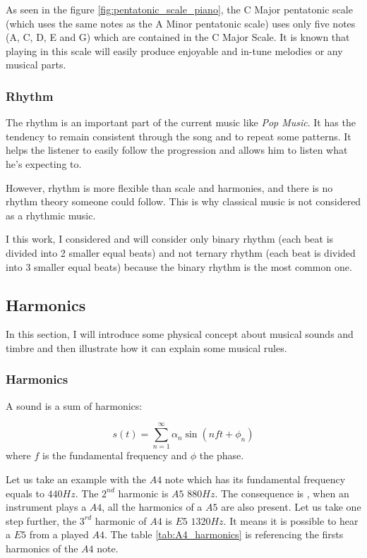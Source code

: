 \documentclass[12pt]{report}
\begin{document}
As seen in the figure \ref{fig:pentatonic_scale_piano}, the C Major pentatonic scale (which uses the same notes as the A Minor pentatonic scale) uses only five notes (A, C, D, E and G) which are contained in the C Major Scale. It is known that playing in this scale will easily produce enjoyable and in-tune melodies or any musical parts. 


\subsubsection{Rhythm}

The rhythm is an important part of the current music like \textit{Pop Music}. It has the tendency to remain consistent through the song and to repeat some patterns.
It helps the listener to easily follow the progression and allows him to listen what he's expecting to.

However, rhythm is more flexible than scale and harmonies, and there is no rhythm theory someone could follow.
This is why classical music is not considered as a rhythmic music.

I this work, I considered and will consider only binary rhythm (each beat is divided into 2 smaller equal beats) and not ternary rhythm (each beat is divided into 3 smaller equal beats) because the binary rhythm is the most common one.


\subsection{Harmonics}
\label{sec:harmonics}

In this section, I will introduce some physical concept about musical sounds and timbre and then illustrate how it can explain some musical rules.

\subsubsection{Harmonics}

A sound is a sum of harmonics:

\begin{equation}
    s(t) = \sum_{n=1}^{\infty} \alpha_{n} \sin(n f t + \phi_{n})
\end{equation}
where $f$ is the fundamental frequency and $\phi$ the phase.

Let us take an example with the $A4$ note which has its fundamental frequency equals to $440 Hz$.
The $2^{nd}$ harmonic is $A5$ $880Hz$.
The consequence is , when an instrument plays a $A4$, all the harmonics of a $A5$ are also present.
Let us take one step further, the $3^{rd}$ harmonic of $A4$ is $E5$ $1320Hz$. It means it is possible to hear a $E5$ from a played $A4$.
The table \ref{tab:A4_harmonics} is referencing the firsts harmonics of the $A4$ note.
\end{document}
